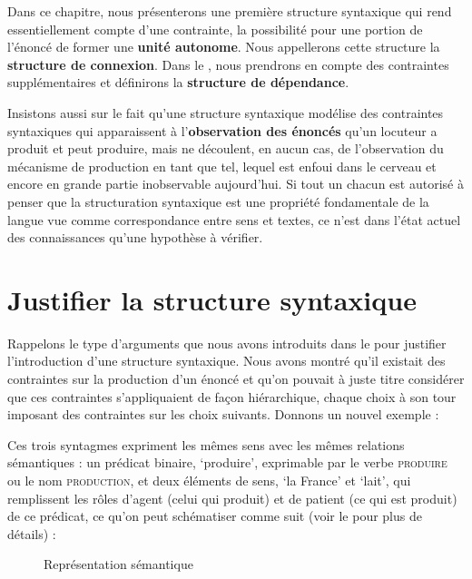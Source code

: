 Dans ce chapitre, nous présenterons une première structure syntaxique qui rend essentiellement compte d’une contrainte, la possibilité pour une portion de l’énoncé de former une \textbf{unité autonome}. Nous appellerons cette structure la \textbf{structure de connexion}. Dans le , nous prendrons en compte des contraintes supplémentaires et définirons la \textbf{structure de dépendance}.

Insistons aussi sur le fait qu’une structure syntaxique modélise des contraintes syntaxiques qui apparaissent à l’\textbf{observation des énoncés} qu’un locuteur a produit et peut produire, mais ne découlent, en aucun cas, de l’observation du mécanisme de production en tant que tel, lequel est enfoui dans le cerveau et encore en grande partie inobservable aujourd’hui. Si tout un chacun est autorisé à penser que la structuration syntaxique est une propriété fondamentale de la langue vue comme correspondance entre sens et textes, ce n’est dans l’état actuel des connaissances qu’une hypothèse à vérifier.

\section{Justifier la structure syntaxique}\label{sec:3.2.1}

Rappelons le type d’arguments que nous avons introduits dans le  pour justifier l’introduction d’une structure syntaxique. Nous avons montré qu’il existait des contraintes sur la production d’un énoncé et qu’on pouvait à juste titre considérer que ces contraintes s’appliquaient de façon hiérarchique, chaque choix à son tour imposant des contraintes sur les choix suivants. Donnons un nouvel exemple :

\z

\z

\z

Ces trois syntagmes expriment les mêmes sens avec les mêmes relations sémantiques : un prédicat binaire, ‘produire’, exprimable par le verbe \textsc{produire} ou le nom \textsc{production,} et deux éléments de sens, ‘la France’ et ‘lait’, qui remplissent les rôles d’agent (celui qui produit) et de patient (ce qui est produit) de ce prédicat, ce qu’on peut schématiser comme suit (voir le  pour plus de détails) :

\begin{figure}

\caption{\label{fig:}Représentation sémantique}
\end{figure}

